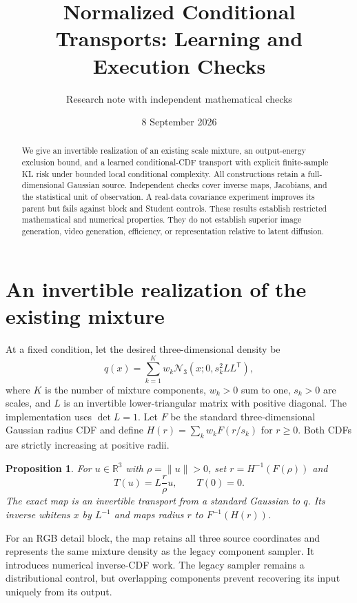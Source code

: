 \documentclass[11pt]{article}
\title{Normalized Conditional Transports: Learning and Execution Checks}
\author{Research note with independent mathematical checks}
\date{8 September 2026}
\newtheorem{proposition}{Proposition}
\newcommand{\R}{\mathbb R}
\begin{document}
\maketitle
\begin{abstract}
We give an invertible realization of an existing scale mixture, an output-energy exclusion bound, and a learned conditional-CDF transport with explicit finite-sample KL risk under bounded local conditional complexity. All constructions retain a full-dimensional Gaussian source. Independent checks cover inverse maps, Jacobians, and the statistical unit of observation. A real-data covariance experiment improves its parent but fails against block and Student controls. These results establish restricted mathematical and numerical properties. They do not establish superior image generation, video generation, efficiency, or representation relative to latent diffusion.
\end{abstract}

\section{An invertible realization of the existing mixture}
At a fixed condition, let the desired three-dimensional density be
\begin{equation}
 q(x)=\sum_{k=1}^{K}w_k\mathcal N_3(x;0,s_k^2LL^{\mathsf T}),
\end{equation}
where $K$ is the number of mixture components, $w_k>0$ sum to one, $s_k>0$ are scales, and $L$ is an invertible lower-triangular matrix with positive diagonal. The implementation uses $\det L=1$. Let $F$ be the standard three-dimensional Gaussian radius CDF and define $H(r)=\sum_k w_kF(r/s_k)$ for $r\geq0$. Both CDFs are strictly increasing at positive radii.

\begin{proposition}
For $u\in\R^3$ with $\rho=\|u\|>0$, set $r=H^{-1}(F(\rho))$ and
\begin{equation}
 T(u)=L\frac{r}{\rho}u,\qquad T(0)=0.
\end{equation}
The exact map is an invertible transport from a standard Gaussian to $q$. Its inverse whitens $x$ by $L^{-1}$ and maps radius $r$ to $F^{-1}(H(r))$.
\end{proposition}
For an RGB detail block, the map retains all three source coordinates and represents the same mixture density as the legacy component sampler. It introduces numerical inverse-CDF work. The legacy sampler remains a distributional control, but overlapping components prevent recovering its input uniquely from its output.
\end{document}
